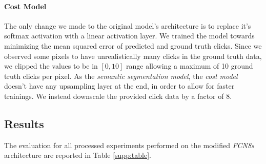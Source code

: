 \documentclass{bmvc2k}
\begin{document}
\paragraph{Cost Model}
The only change we made to the original model's architecture is to replace it's softmax activation with a linear activation layer. We trained the model towards minimizing the mean squared error of predicted and ground truth clicks. Since we observed some pixels to have unrealistically many clicks in the ground truth data, we clipped the values to be in $[0,10]$ range allowing a maximum of 10 ground truth clicks per pixel. As the \textit{semantic segmentation model}, the \textit{cost model} doesn't have any upsampling layer at the end, in order to allow for faster trainings. We instead downscale the provided click data by a factor of $8$. 

\clearpage
\subsection{Results}
\label{appendix:results}
The evaluation for all processed experiments performed on the modified \textit{FCN8s} architecture are reported in Table \ref{supp:table}.
\end{document}
